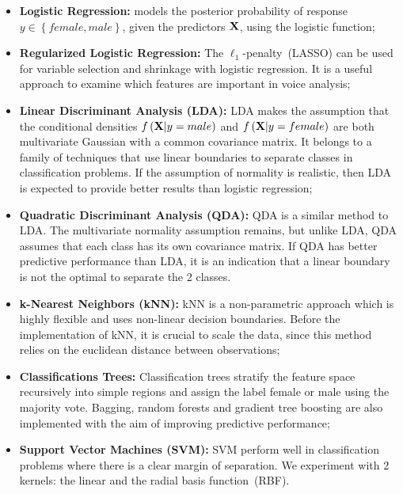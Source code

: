 \begin{itemize}
	\item \textbf{Logistic Regression:} models the posterior probability of response $y\in \left\lbrace female, male \right\rbrace$, given the predictors $\mathbf{X}$, using the logistic function;
	
	\item \textbf{Regularized Logistic Regression:} The $\ell_1$-penalty~(LASSO) can be used for variable selection and shrinkage with logistic regression. 
	It is a useful approach to examine which features are  important in voice analysis;
	
	\item \textbf{Linear Discriminant Analysis (LDA):} LDA makes the assumption that the conditional densities $f \left(\mathbf{X}|y=male \right)$ and $ f \left(\mathbf{X}|y=female \right)$ are both multivariate Gaussian with a common covariance matrix. 
	It belongs to a family of techniques that use linear boundaries to separate classes in classification problems. 
	If the assumption of normality is realistic, then LDA is expected to provide better results than logistic regression;
	
	\item \textbf{Quadratic Discriminant Analysis (QDA):} QDA is a similar method to LDA. 
	The multivariate normality assumption remains, but unlike LDA, QDA assumes that each class has its own covariance matrix. 
	If QDA has better predictive performance than LDA, it is an indication that a linear boundary is not the optimal to separate the 2 classes.
	
	\item \textbf{k-Nearest Neighbors (kNN):} kNN is a non-parametric approach which is highly flexible and uses non-linear decision boundaries. 
	Before the implementation of kNN, it is crucial to scale the data, since this method relies on the euclidean distance between observations;
	
	\item \textbf{Classifications Trees:} Classification trees stratify the feature space recursively into simple regions and assign the label female or male using the majority vote. 
	Bagging, random forests and gradient tree boosting are also implemented with the aim of improving predictive performance;
	
	\item \textbf{Support Vector Machines (SVM):} SVM perform well in classification problems where there is a clear margin of separation. 
	We experiment with 2 kernels: the linear and the radial basis function~(RBF).
\end{itemize}
